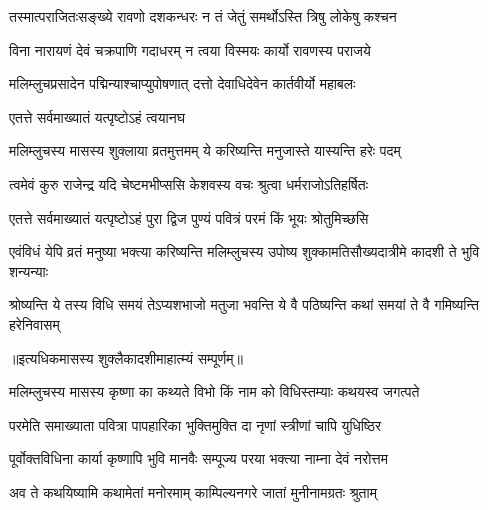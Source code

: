 \twolineshloka
{तस्मात्पराजितःसङ्ख्ये रावणो दशकन्धरः}
{न तं जेतुं समर्थोऽस्ति त्रिषु लोकेषु कश्चन} %

\twolineshloka
{विना नारायणं देवं चक्रपाणि गदाधरम्}
{न त्वया विस्मयः कार्यो रावणस्य पराजये} %

\twolineshloka
{मलिम्लुचप्रसादेन पद्मिन्याश्चाप्युपोषणात्}
{दत्तो देवाधिदेवेन कार्तवीर्यो महाबलः} %



\onelineshloka
{एतत्ते सर्वमाख्यातं यत्पृष्टोऽहं त्वयानघ} %

\twolineshloka
{मलिम्लुचस्य मासस्य शुक्लाया व्रतमुत्तमम्}
{ये करिष्यन्ति मनुजास्ते यास्यन्ति हरेः पदम्} %

\twolineshloka
{त्वमेवं कुरु राजेन्द्र यदि चेष्टमभीप्ससि}
{केशवस्य वचः श्रुत्वा धर्मराजोऽतिहर्षितः} %



\twolineshloka
{एतत्ते सर्वमाख्यातं यत्पृष्टोऽहं पुरा द्विज}
{पुण्यं पवित्रं परमं किं भूयः श्रोतुमिच्छसि} %

\twolineshloka
{एवंविधं येपि व्रतं मनुष्या भक्त्या करिष्यन्ति मलिम्लुचस्य}
{उपोष्य शुक्कामतिसौख्यदात्रीमे कादशी ते भुवि शन्यन्याः} %

\twolineshloka
{श्रोष्यन्ति ये तस्य विधि समयं तेऽप्यशभाजो मतुजा भवन्ति}
{ये वै पठिष्यन्ति कथां समयां ते वै गमिष्यन्ति हरेनिवासम्} %

॥इत्यधिकमासस्य शुक्लैकादशीमाहात्म्यं सम्पूर्णम्॥

\hyperref[sec:ekadashi_mahatmyam_vrata_raja]{\closesub}
\clearpage

\label{sec:vrata-raja-purushottama-krishna-kamala}


\twolineshloka
{मलिम्लुचस्य मासस्य कृष्णा का कथ्यते विभो}
{किं नाम को विधिस्तम्याः कथयस्व जगत्पते} %


\twolineshloka
{परमेति समाख्याता पवित्रा पापहारिका}
{भुक्तिमुक्ति दा नृणां स्त्रीणां चापि युधिष्ठिर} %

\twolineshloka
{पूर्वोक्तविधिना कार्या कृष्णापि भुवि मानवैः}
{सम्पूज्य परया भक्त्या नाम्ना देवं नरोत्तम} %

\twolineshloka
{अव ते कथयिष्यामि कथामेतां मनोरमाम्}
{काम्पिल्यनगरे जातां मुनीनामग्रतः श्रुताम्} %

